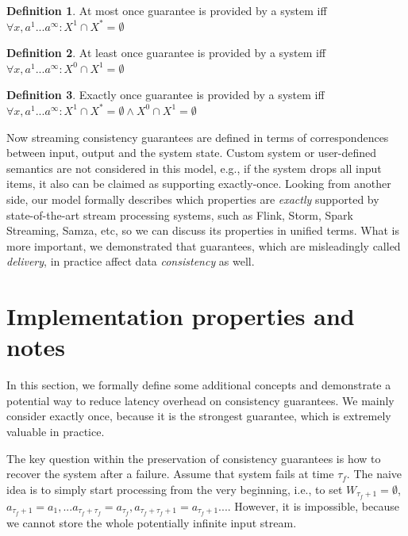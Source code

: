\documentclass[sigconf]{acmart}
\theoremstyle{definition}
\newtheorem{definition}{Definition}
\begin{document}
\begin{definition}{At most once}
guarantee is provided by a system iff $\forall{x,a^{1}...a^\infty}:X^{1}\cap{X^{*}}=\emptyset$
\end{definition}

\begin{definition}{At least once}
guarantee is provided by a system iff $\forall{x,a^{1}...a^\infty}:X^{0}\cap{X^{1}}=\emptyset$
\end{definition}

\begin{definition}{Exactly once}
guarantee is provided by a system iff $\forall{x,a^{1}...a^\infty}:X^{1}\cap{X^{*}}=\emptyset \wedge X^{0}\cap{X^{1}}=\emptyset$
\end{definition}

Now streaming consistency guarantees are defined in terms of correspondences between input, output and the system state. Custom system or user-defined semantics are not considered in this model, e.g., if the system drops all input items, it also can be claimed as supporting exactly-once. Looking from another side, our model formally describes which properties are {\em exactly} supported by state-of-the-art stream processing systems, such as Flink, Storm, Spark Streaming, Samza, etc, so we can discuss its properties in unified terms. What is more important, we demonstrated that guarantees, which are misleadingly called {\em delivery}, in practice affect data {\em consistency} as well.

\section{Implementation properties and notes}

In this section, we formally define some additional concepts and demonstrate a potential way to reduce latency overhead on consistency guarantees. We mainly consider exactly once, because it is the strongest guarantee, which is extremely valuable in practice.	

The key question within the preservation of consistency guarantees is how to recover the system after a failure. Assume that system fails at time $\tau_f$. The naive idea is to simply start processing from the very beginning, i.e., to set $W_{\tau_f+1}=\emptyset$, $a_{\tau_f+1}=a_1,...a_{\tau_f+\tau_f}=a_{\tau_f},a_{\tau_f+\tau_f+1}=a_{\tau_f+1}...$. However, it is impossible, because we cannot store the whole potentially infinite input stream.
\end{document}
